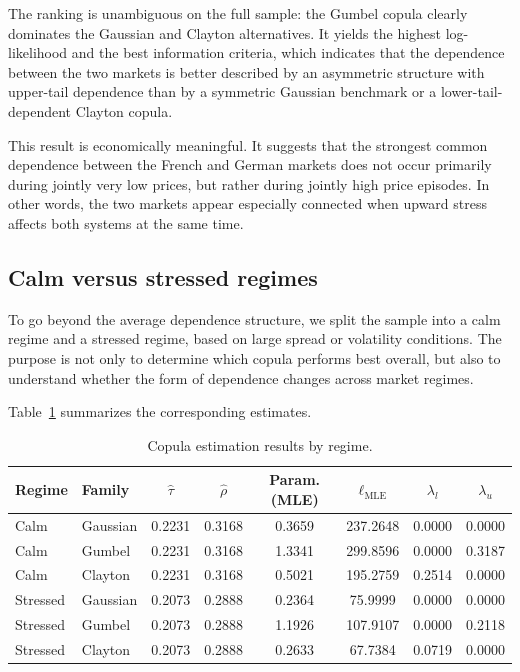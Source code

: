 The ranking is unambiguous on the full sample: the Gumbel copula clearly dominates the Gaussian and Clayton alternatives. It yields the highest log-likelihood and the best information criteria, which indicates that the dependence between the two markets is better described by an asymmetric structure with upper-tail dependence than by a symmetric Gaussian benchmark or a lower-tail-dependent Clayton copula.

This result is economically meaningful. It suggests that the strongest common dependence between the French and German markets does not occur primarily during jointly very low prices, but rather during jointly high price episodes. In other words, the two markets appear especially connected when upward stress affects both systems at the same time.

\subsection{Calm versus stressed regimes}

To go beyond the average dependence structure, we split the sample into a calm regime and a stressed regime, based on large spread or volatility conditions. The purpose is not only to determine which copula performs best overall, but also to understand whether the form of dependence changes across market regimes.

Table~\ref{tab:copula_regimes} summarizes the corresponding estimates.

\begin{table}[H]
\centering
\caption{Copula estimation results by regime.}
\label{tab:copula_regimes}
\begin{tabular}{llcccccc}
\toprule
Regime & Family & \(\hat\tau\) & \(\hat\rho\) & Param. (MLE) & \(\ell_{\text{MLE}}\) & \(\lambda_l\) & \(\lambda_u\) \\
\midrule
Calm     & Gaussian & 0.2231 & 0.3168 & 0.3659 & 237.2648 & 0.0000 & 0.0000 \\
Calm     & Gumbel   & 0.2231 & 0.3168 & 1.3341 & 299.8596 & 0.0000 & 0.3187 \\
Calm     & Clayton  & 0.2231 & 0.3168 & 0.5021 & 195.2759 & 0.2514 & 0.0000 \\
Stressed & Gaussian & 0.2073 & 0.2888 & 0.2364 & 75.9999  & 0.0000 & 0.0000 \\
Stressed & Gumbel   & 0.2073 & 0.2888 & 1.1926 & 107.9107 & 0.0000 & 0.2118 \\
Stressed & Clayton  & 0.2073 & 0.2888 & 0.2633 & 67.7384  & 0.0719 & 0.0000 \\
\bottomrule
\end{tabular}
\end{table}

